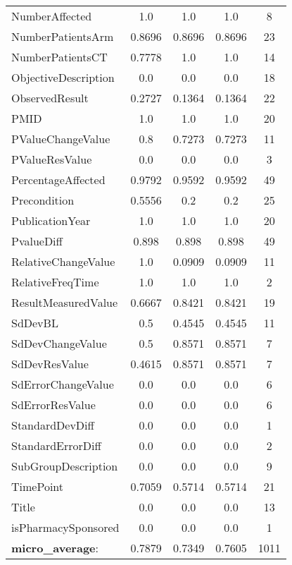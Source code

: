 \begin{longtable}{ l c c c c}
NumberAffected & 1.0 & 1.0 & 1.0 & 8\\
NumberPatientsArm & 0.8696 & 0.8696 & 0.8696 & 23\\
NumberPatientsCT & 0.7778 & 1.0 & 1.0 & 14\\
ObjectiveDescription & 0.0 & 0.0 & 0.0 & 18\\
ObservedResult & 0.2727 & 0.1364 & 0.1364 & 22\\
PMID & 1.0 & 1.0 & 1.0 & 20\\
PValueChangeValue & 0.8 & 0.7273 & 0.7273 & 11\\
PValueResValue & 0.0 & 0.0 & 0.0 & 3\\
PercentageAffected & 0.9792 & 0.9592 & 0.9592 & 49\\
Precondition & 0.5556 & 0.2 & 0.2 & 25\\
PublicationYear & 1.0 & 1.0 & 1.0 & 20\\
PvalueDiff & 0.898 & 0.898 & 0.898 & 49\\
RelativeChangeValue & 1.0 & 0.0909 & 0.0909 & 11\\
RelativeFreqTime & 1.0 & 1.0 & 1.0 & 2\\
ResultMeasuredValue & 0.6667 & 0.8421 & 0.8421 & 19\\
SdDevBL & 0.5 & 0.4545 & 0.4545 & 11\\
SdDevChangeValue & 0.5 & 0.8571 & 0.8571 & 7\\
SdDevResValue & 0.4615 & 0.8571 & 0.8571 & 7\\
SdErrorChangeValue & 0.0 & 0.0 & 0.0 & 6\\
SdErrorResValue & 0.0 & 0.0 & 0.0 & 6\\
StandardDevDiff & 0.0 & 0.0 & 0.0 & 1\\
StandardErrorDiff & 0.0 & 0.0 & 0.0 & 2\\
SubGroupDescription & 0.0 & 0.0 & 0.0 & 9\\
TimePoint & 0.7059 & 0.5714 & 0.5714 & 21\\
Title & 0.0 & 0.0 & 0.0 & 13\\
isPharmacySponsored & 0.0 & 0.0 & 0.0 & 1\\
\textbf{micro\_average}: & 0.7879 & 0.7349 & 0.7605 & 1011 
\label{tab:Diabetes_eventextr}
\end{longtable}
